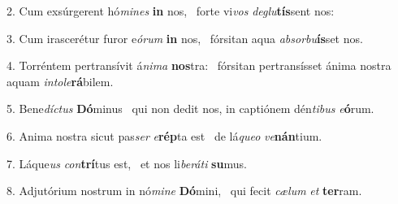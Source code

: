 2. Cum exsúrgerent hó\textit{mi}\textit{nes} \textbf{in} nos, \ast\  forte vi\textit{vos} \textit{de}\textit{glu}\textbf{tís}sent nos:\

3. Cum irascerétur furor e\textit{ó}\textit{rum} \textbf{in} nos, \ast\  fórsitan aqua \textit{ab}\textit{sor}\textit{bu}\textbf{ís}set nos.\

4. Torréntem pertransívit á\textit{ni}\textit{ma} \textbf{nos}tra: \ast\  fórsitan pertransísset ánima nostra aquam \textit{in}\textit{to}\textit{le}\textbf{rá}bilem.\

5. Bene\textit{díc}\textit{tus} \textbf{Dó}minus \ast\  qui non dedit nos, in captiónem dén\textit{ti}\textit{bus} \textit{e}\textbf{ó}rum.\

6. Anima nostra sicut pas\textit{ser} \textit{e}\textbf{rép}ta est \ast\  de lá\textit{que}\textit{o} \textit{ve}\textbf{nán}tium.\

7. Láque\textit{us} \textit{con}\textbf{trí}tus est, \ast\  et nos li\textit{be}\textit{rá}\textit{ti} \textbf{su}mus.\

8. Adjutórium nostrum in nó\textit{mi}\textit{ne} \textbf{Dó}mini, \ast\  qui fecit \textit{cæ}\textit{lum} \textit{et} \textbf{ter}ram.\

